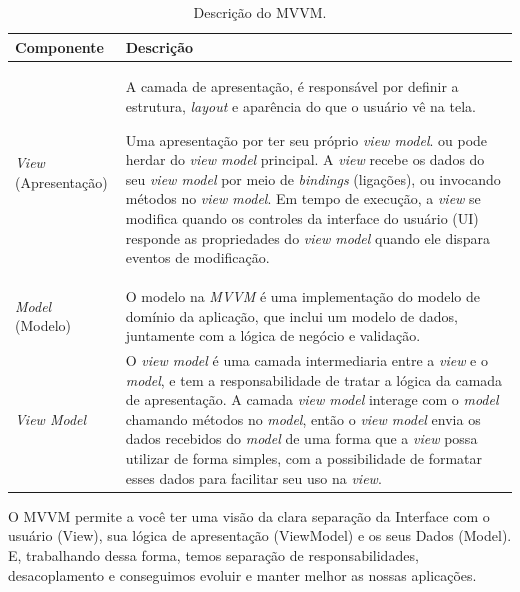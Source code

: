 \begin{table}[htp]
    \begin{center}
        \begin{tabular}{|l|p{11cm}|}
            \hline \textbf{Componente} & \textbf{Descrição} \\
            \hline \textit{View} (Apresentação) & 
            A camada de apresentação, é responsável por definir a estrutura, \textit{layout} e aparência do que o usuário vê na tela.
            
            Uma apresentação por ter seu próprio \textit{view model}. ou pode herdar do \textit{view model} principal. A \textit{view} recebe os dados do seu \textit{view model} por meio de \textit{bindings} (ligações), ou invocando métodos no \textit{view model}. Em tempo de execução, a \textit{view} se modifica quando os controles da interface do usuário (UI) responde  as propriedades do \textit{view model} quando ele dispara eventos de modificação.
             \\
            \hline \textit{Model} (Modelo) & 
            O modelo na \textit{MVVM} é uma implementação do modelo de domínio da aplicação, que inclui um modelo de dados, juntamente com a lógica de negócio e validação. \\
            \hline \textit{View Model} & 
            O \textit{view model} é uma camada intermediaria entre a \textit{view} e o \textit{model}, e tem a responsabilidade de tratar a lógica da camada de apresentação. A camada \textit{view model} interage com o \textit{model} chamando métodos no \textit{model}, então o \textit{view model} envia os dados recebidos do \textit{model} de uma forma que a \textit{view} possa utilizar de forma simples, com a possibilidade de formatar esses dados para facilitar seu uso na \textit{view}. \\
            \hline
        \end{tabular}
        \caption{Descrição do \ac{MVVM}.}
        \label{tbl:mvvm}
    \end{center}
\end{table}

\begin{citacao}
    O MVVM permite a você ter uma visão da clara separação da Interface com o usuário (View), sua lógica de apresentação (ViewModel) e os seus Dados (Model). E, trabalhando dessa forma, temos separação de responsabilidades, desacoplamento e conseguimos evoluir e manter melhor as nossas aplicações. \cite{ferreira_mvvm}
\end{citacao}

